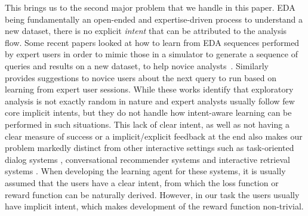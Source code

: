 This brings us to the second major problem that we handle in this paper. EDA being fundamentally an open-ended and expertise-driven process to understand a new dataset, there is no explicit \emph{intent} that can be attributed to the analysis flow.
Some recent papers looked at how to learn from EDA sequences performed by expert users in order to mimic those in a simulator to generate a sequence of queries and results on a new dataset, to help novice analysts~\cite{atena2020sigmod}.
Similarly~\cite{edasim2018kdd} provides suggestions to novice users about the next query to run based on learning from expert user sessions. 
While these works identify that exploratory analysis is not exactly random in nature and expert analysts usually follow few core implicit intents, but they do not handle how intent-aware learning can be performed in such situations. 
This lack of clear intent, as well as not having a clear measure of success or a implicit/explicit feedback at the end also makes our problem markedly distinct from other interactive settings such as task-oriented dialog systems \cite{liu2018dialogue,shi2019build}, conversational recommender systems \cite{lei2020interactive,zhang2020conversational} and interactive retrieval systems \cite{guo2018dialog}. When developing the learning agent for these systems, it is usually assumed that the users have a clear intent, from which the loss function or reward function can be naturally derived. However, in our task the users usually have implicit intent, which makes development of the reward function non-trivial. %
%


